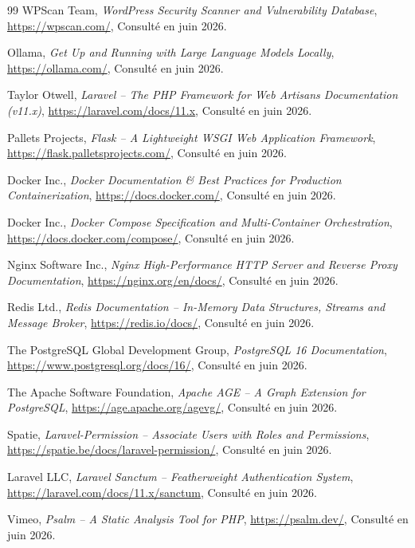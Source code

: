 \begin{thebibliography}{99}
     WPScan Team, \textit{WordPress Security Scanner and Vulnerability Database}, \url{https://wpscan.com/}, Consult\'e en juin 2026.

     Ollama, \textit{Get Up and Running with Large Language Models Locally}, \url{https://ollama.com/}, Consult\'e en juin 2026.

     Taylor Otwell, \textit{Laravel -- The PHP Framework for Web Artisans Documentation (v11.x)}, \url{https://laravel.com/docs/11.x}, Consult\'e en juin 2026.

     Pallets Projects, \textit{Flask -- A Lightweight WSGI Web Application Framework}, \url{https://flask.palletsprojects.com/}, Consult\'e en juin 2026.

     Docker Inc., \textit{Docker Documentation \& Best Practices for Production Containerization}, \url{https://docs.docker.com/}, Consult\'e en juin 2026.

     Docker Inc., \textit{Docker Compose Specification and Multi-Container Orchestration}, \url{https://docs.docker.com/compose/}, Consult\'e en juin 2026.

     Nginx Software Inc., \textit{Nginx High-Performance HTTP Server and Reverse Proxy Documentation}, \url{https://nginx.org/en/docs/}, Consult\'e en juin 2026.

     Redis Ltd., \textit{Redis Documentation -- In-Memory Data Structures, Streams and Message Broker}, \url{https://redis.io/docs/}, Consult\'e en juin 2026.

     The PostgreSQL Global Development Group, \textit{PostgreSQL 16 Documentation}, \url{https://www.postgresql.org/docs/16/}, Consult\'e en juin 2026.

     The Apache Software Foundation, \textit{Apache AGE -- A Graph Extension for PostgreSQL}, \url{https://age.apache.org/agevg/}, Consult\'e en juin 2026.

     Spatie, \textit{Laravel-Permission -- Associate Users with Roles and Permissions}, \url{https://spatie.be/docs/laravel-permission/}, Consult\'e en juin 2026.

     Laravel LLC, \textit{Laravel Sanctum -- Featherweight Authentication System}, \url{https://laravel.com/docs/11.x/sanctum}, Consult\'e en juin 2026.

     Vimeo, \textit{Psalm -- A Static Analysis Tool for PHP}, \url{https://psalm.dev/}, Consult\'e en juin 2026.


\end{thebibliography}
